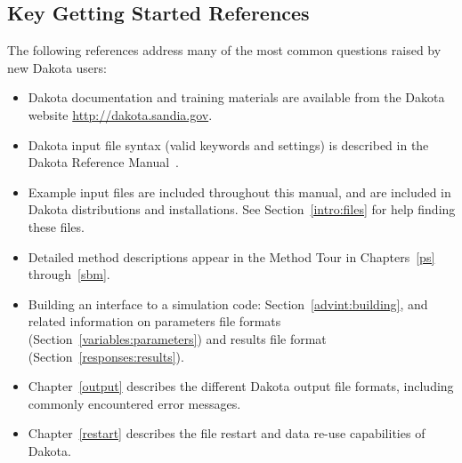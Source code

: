 
\subsection{Key Getting Started References}\label{tutorial:keyrefs}

The following references address many of the most common questions
raised by new Dakota users:
\begin{itemize}
\item Dakota documentation and training materials are available from
  the Dakota website \url{http://dakota.sandia.gov}.

\item Dakota input file syntax (valid keywords and settings) is
  described in the Dakota Reference Manual~\cite{RefMan}.

\item Example input files are included throughout this manual, and
  are included in Dakota distributions and installations. See
  Section~\ref{intro:files} for help finding these files.

\item Detailed method descriptions appear in the Method Tour in
  Chapters~\ref{ps} through~\ref{sbm}.

\item Building an interface to a simulation code:
  Section~\ref{advint:building}, and related information on parameters
  file formats (Section~\ref{variables:parameters}) and results file
  format (Section~\ref{responses:results}).

\item Chapter~\ref{output} describes the different Dakota output file
  formats, including commonly encountered error messages.

\item Chapter~\ref{restart} describes the file restart and data re-use
  capabilities of Dakota.

\end{itemize}
